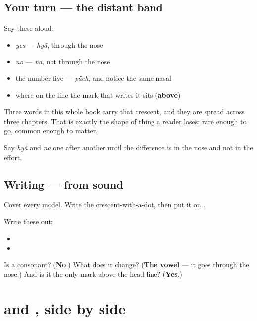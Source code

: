 \subsection*{Your turn — the distant band}
Say these aloud:

\begin{itemize}
\raggedright
  \item \emph{yes} — \emph{hyã}, through the nose
  \item \emph{no} — \emph{nā}, not through the nose
  \item the number five — \emph{pā̃ch}, and notice the same nasal
  \item where on the line the mark that writes it sits (\textbf{above})
\end{itemize}

Three words in this whole book carry that crescent, and they are spread across three chapters. That is exactly the shape of thing a reader loses: rare enough to go, common enough to matter.

Say \emph{hyã} and \emph{nā} one after another until the difference is in the nose and not in the effort.

\subsection*{Writing — from sound}
Cover every model. Write the crescent-with-a-dot, then put it on \textbf{}.

Write these out:

\begin{itemize}
\raggedright
  \item {}
  \item {}
\end{itemize}

\begin{tcolorbox}[breakable,colback=teal!4,colframe=teal!35!black,title={Before you move on}]
Is \textbf{} a consonant? (\textbf{No}.) What does it change? (\textbf{The vowel} — it goes through the nose.) And is it the only mark above the head-line? (\textbf{Yes}.)
\end{tcolorbox}
\section[Practice]{ and , side by side}

\label{lesson:BN-R01-hyan-again}




